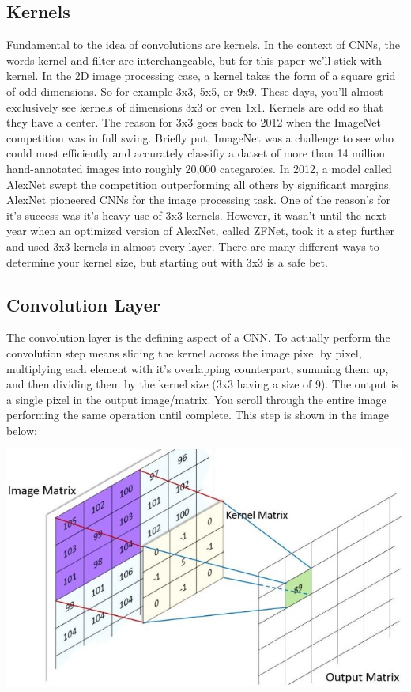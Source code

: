 \documentclass{article}
\begin{document}
    \subsection{Kernels}
        Fundamental to the idea of convolutions are kernels. In the context of CNNs, the words kernel and filter are interchangeable, but for this paper we'll stick with kernel. In the 2D image processing case, a kernel takes the form of a square grid of odd dimensions. So for example 3x3, 5x5, or 9x9. These days, you'll almost exclusively see kernels of dimensions 3x3 or even 1x1. Kernels are odd so that they have a center. The reason for 3x3 goes back to 2012 when the ImageNet competition was in full swing. Briefly put, ImageNet was a challenge to see who could most efficiently and accurately classifiy a datset of more than 14 million hand-annotated images into roughly 20,000 categaroies. In 2012, a model called AlexNet swept the competition outperforming all others by significant margins. AlexNet pioneered CNNs for the image processing task. One of the reason's for it's success was it's heavy use of 3x3 kernels. However, it wasn't until the next year when an optimized version of AlexNet, called ZFNet, took it a step further and used 3x3 kernels in almost every layer. There are many different ways to determine your kernel size, but starting out with 3x3 is a safe bet.
        
    \subsection{Convolution Layer}
        The convolution layer is the defining aspect of a CNN. To actually perform the convolution step means sliding the kernel across the image pixel by pixel, multiplying each element with it's overlapping counterpart, summing them up, and then dividing them by the kernel size (3x3 having a size of 9). The output is a single pixel in the output image/matrix. You scroll through the entire image performing the same operation until complete. This step is shown in the image below:
        
        \begin{center}
            \includegraphics[scale=0.6]{images/kernel.jpg}
        \end{center}
        
\end{document}
